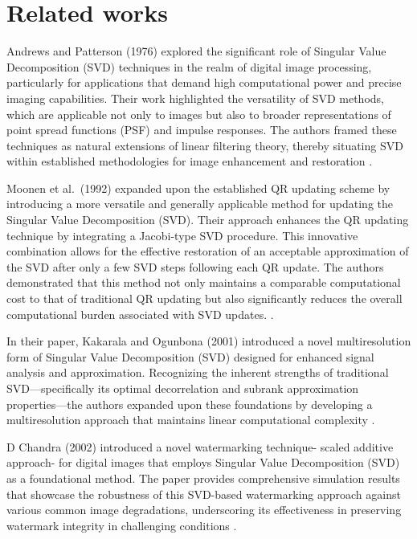 \documentclass[
  journal,
]{IEEEtran}%
\begin{document}
\section{Related works}\label{related-works}

Andrews and Patterson (1976) explored the significant role of Singular
Value Decomposition (SVD) techniques in the realm of digital image
processing, particularly for applications that demand high computational
power and precise imaging capabilities. Their work highlighted the
versatility of SVD methods, which are applicable not only to images but
also to broader representations of point spread functions (PSF) and
impulse responses. The authors framed these techniques as natural
extensions of linear filtering theory, thereby situating SVD within
established methodologies for image enhancement and restoration
.

Moonen et al.~(1992) expanded upon the established QR updating scheme by
introducing a more versatile and generally applicable method for
updating the Singular Value Decomposition (SVD). Their approach enhances
the QR updating technique by integrating a Jacobi-type SVD procedure.
This innovative combination allows for the effective restoration of an
acceptable approximation of the SVD after only a few SVD steps following
each QR update. The authors demonstrated that this method not only
maintains a comparable computational cost to that of traditional QR
updating but also significantly reduces the overall computational burden
associated with SVD updates. .

In their paper, Kakarala and Ogunbona (2001) introduced a novel
multiresolution form of Singular Value Decomposition (SVD) designed for
enhanced signal analysis and approximation. Recognizing the inherent
strengths of traditional SVD---specifically its optimal decorrelation
and subrank approximation properties---the authors expanded upon these
foundations by developing a multiresolution approach that maintains
linear computational complexity
.

D Chandra (2002) introduced a novel watermarking technique- scaled
additive approach- for digital images that employs Singular Value
Decomposition (SVD) as a foundational method. The paper provides
comprehensive simulation results that showcase the robustness of this
SVD-based watermarking approach against various common image
degradations, underscoring its effectiveness in preserving watermark
integrity in challenging conditions
.
\end{document}
